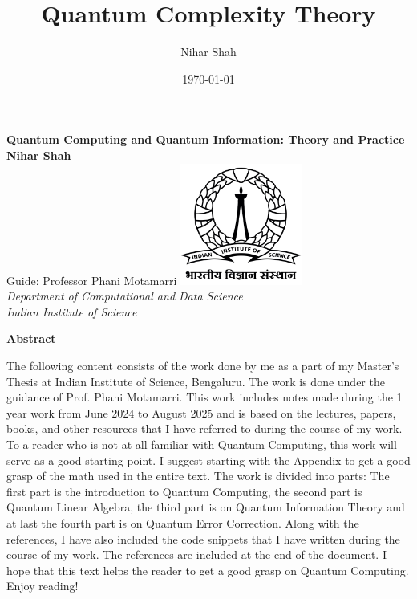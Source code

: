 \documentclass[12pt, oneside]{book}
\theoremstyle{definition}
\theoremstyle{definition}
\theoremstyle{remark}
\newcommand{\abstractname}{Abstract}
\newenvironment{abstract}{%
\clearpage
\null\vfill
\begin{center}%
    \bfseries \abstractname
\end{center}}%
{\vfill\null}
\begin{document}
\frontmatter

\title{\vspace{-3.0cm}Quantum Complexity Theory}  %
\author{Nihar Shah}  %
\date{\today}  %
\maketitle  %

\begin{center}
\vspace*{2cm}
\textbf{Quantum Computing and Quantum Information: Theory and Practice}\\[1cm]
\textbf{Nihar Shah}\\[1cm]
Guide: Professor Phani Motamarri
\vfill
\includegraphics[width=0.3\textwidth]{images/IISc_Master_Seal_Black.jpg}\\[1cm]
\large \textit{Department of Computational and Data Science}\\
\large \textit{Indian Institute of Science}
\vfill
\end{center}

\frontmatter

\begin{abstract}
The following content consists of the work done by me as a part of my Master's Thesis at Indian
Institute of Science, Bengaluru. The work is done under the guidance of Prof. Phani Motamarri. 
This work includes notes made during the 1 year work from June 2024 to August 2025 and is based on the
lectures, papers, books, and other resources that I have referred to during the course of my work.
To a reader who is not at all familiar with Quantum Computing, this work will serve as a good starting point. 
I suggest starting with the Appendix to get a good grasp of the math used in the entire text. 
The work is divided into parts: The first part is the introduction to Quantum Computing, the second part is Quantum Linear Algebra, the third part is on Quantum Information Theory and at last the fourth part is on Quantum Error Correction. Along with the references, 
I have also included the code snippets that I have written during the course of my work. The references are included at the end of the document.
I hope that this text helps the reader to get a good grasp on Quantum Computing. Enjoy reading!
\end{abstract}
\end{document}
